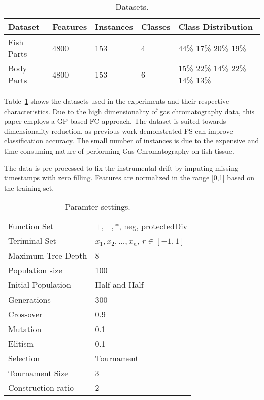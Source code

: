\documentclass[runningheads]{llncs}
\begin{document}
\begin{table}
  \caption{Datasets.}
  \centering 
  \begin{tabular}{ l l l l l }
    \hline 
    Dataset & Features & Instances & Classes & Class Distribution \\ 
    \hline 
    Fish Parts & 4800 & 153 & 4 & 44\% 17\% 20\% 19\% \\ 
    Body Parts & 4800 & 153 & 6 & 15\% 22\% 14\% 22\% 14\% 13\% \\
    \hline 
  \end{tabular}
  \label{tab:datasets}
\end{table}

Table~\ref{tab:datasets} shows the datasets used in the experiments and their respective characteristics.
Due to the high dimensionality of gas chromatography data, this paper employs a GP-based FC approach.
The dataset is suited towards dimensionality reduction, as previous work \cite{long2022ai} demonstrated FS can improve classification accuracy.
The small number of instances is due to the expensive and time-consuming nature of performing Gas Chromatography on fish tissue.

The data is pre-processed to fix the instrumental drift by imputing missing timestamps with zero filling.
Features are normalized in the range [0,1] based on the training set. 

\begin{table}
  \caption{Paramter settings.}
  \centering 
  \begin{tabular}{ l l }
  \hline 
  Function Set & $+,-,*$, neg, protectedDiv \\ 
  Teriminal Set & $x_1, x_2, ..., x_n$, $r \in [-1,1]$ \\
  Maximum Tree Depth & 8 \\ 
  Population size & 100 \\ 
  Initial Population & Half and Half \\ 
  Generations & 300 \\ 
  Crossover & 0.9 \\ 
  Mutation & 0.1 \\ 
  Elitism & 0.1 \\ 
  Selection & Tournament \\ 
  Tournament Size & 3 \\ 
  Construction ratio & 2 \\ 
  \hline 
  \end{tabular}
  \label{tab:parameters}
\end{table}
\end{document}
